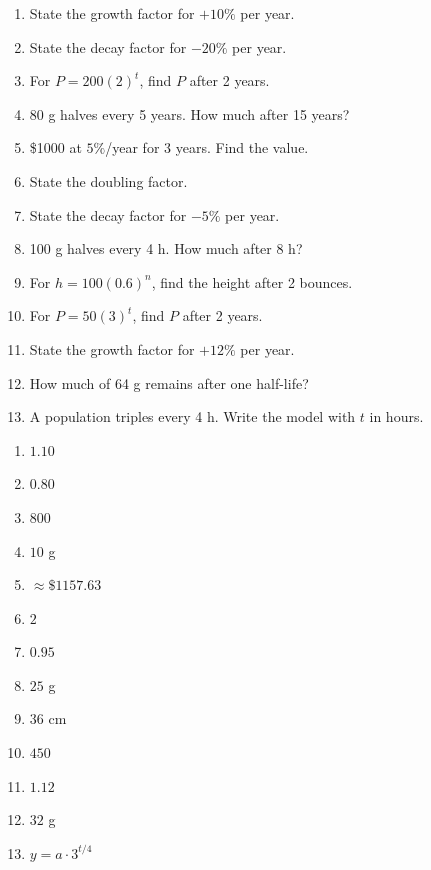 \documentclass[11pt]{article}
\begin{document}
\begin{recapbox}
\begin{multicols}{2}
\small
\begin{enumerate}[leftmargin=*,itemsep=3pt]
  \item State the growth factor for $+10\%$ per year.
  \item State the decay factor for $-20\%$ per year.
  \item For $P=200(2)^t$, find $P$ after 2 years.
  \item 80 g halves every 5 years. How much after 15 years?
  \item \$1000 at $5\%$/year for 3 years. Find the value.
  \item State the doubling factor.
  \item State the decay factor for $-5\%$ per year.
  \item 100 g halves every 4 h. How much after 8 h?
  \item For $h=100(0.6)^n$, find the height after 2 bounces.
  \item For $P=50(3)^t$, find $P$ after 2 years.
  \item State the growth factor for $+12\%$ per year.
  \item How much of 64 g remains after one half-life?
  \item A population triples every 4 h. Write the model with $t$ in hours.
\end{enumerate}
\end{multicols}
\end{recapbox}

\begin{keybox}
\begin{multicols}{2}
\small
\begin{enumerate}[leftmargin=*,itemsep=3pt]
  \item $1.10$
  \item $0.80$
  \item $800$
  \item $10$ g
  \item $\approx\$1157.63$
  \item $2$
  \item $0.95$
  \item $25$ g
  \item $36$ cm
  \item $450$
  \item $1.12$
  \item $32$ g
  \item $y=a\cdot3^{t/4}$
\end{enumerate}
\end{multicols}
\end{keybox}
\end{document}
